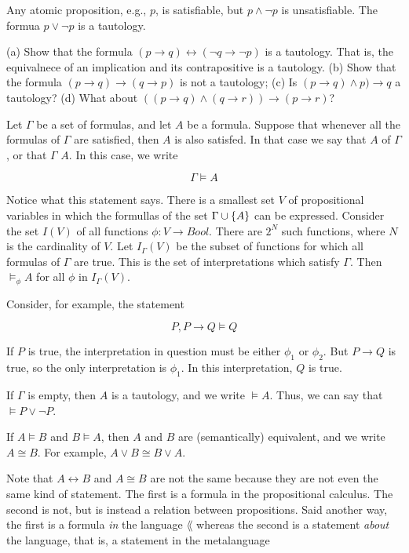 Any atomic  proposition, e.g., $p$, is satisfiable, but  $p \land \neg p$ is unsatisfiable.  The formua  $p  \lor \neg p$ is a tautology.

\begin{exercise}
(a) Show that the formula $(p \to q) \leftrightarrow (\neg q \to \neg p)$ is a tautology.  That is, the equivalnece of an implication and its contrapositive is a tautology. (b) Show that the formula $(p \to q) \to (q \to  p)$ is not a tautology;
(c) Is $(p \to q) \land p) \to q$ a tautology? (d) What about $((p \to q) \land (q \to r)) \to (p \to r)$?
\end{exercise}


Let $\Gamma$ be a set of formulas, and let $A$ be a formula.  Suppose that whenever all the formulas of $\Gamma$ are satisfied,  then $A$  is also satisfed. In that case we say that $A$  of $\Gamma$, or that $\Gamma$  $A$.  In this case, we write

$$
\Gamma \models A
$$

Notice what this statement says.  There is a smallest set $V$ of propositional variables in which the formullas of the set $\Gamma \cup \{ A \}$ can be expressed.  Consider the set $I(V)$ of all functions $\phi: V \to Bool$.  There are $2^N$ such functions, where $N$ is the cardinality of $V$.  Let $I_\Gamma(V)$ be the subset of functions for which all formulas of $\Gamma$ are true.  This is the set of interpretations which satisfy $\Gamma$. Then $\models_\phi A$ for all $\phi$ in $I_\Gamma(V)$.


Consider, for example, the statement

$$
P, P \to Q \models Q
$$

If $P$ is true, the interpretation in question must be either $\phi_1$ or
$\phi_2$. But $P \to Q$ is true, so the only interpretation is $\phi_1$.  In this interpretation, $Q$ is true. 


If $\Gamma$ is empty, then $A$ is a tautology, and we write $\models A$.   Thus, we can say that $\models P \lor \neg P$.


If $A \models B$ and $B \models A$, then $A$ and $B$  are (semantically) equivalent, and we write $A \cong B$.  For example, $A \lor B \cong B \lor A$.

Note that $A \leftrightarrow B$ and $A \cong B$ are not the same because they are not even the same kind of statement.  The first is a formula in the propositional calculus.  The second is not, but is instead a relation between propositions.  Said another way, the first is a formula \emph{in} the language $\lang$ whereas the second is a statement \emph{about} the language, that is, a statement in the metalanguage


